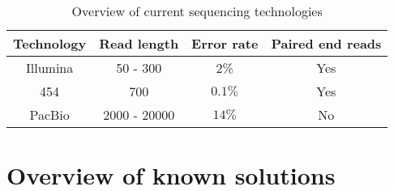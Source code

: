 \begin{table}[h]
\centering
\begin{tabular}{|c|c|c|c|}
\hline
Technology & Read length & Error rate & Paired end reads \\\hline
Illumina & 50 - 300 & 2\% & Yes\\\hline
454 & 700 & $0.1\%$ & Yes \\\hline
PacBio & 2000 - 20000 & $14\%$ & No \\\hline
\end{tabular}
\caption{Overview of current sequencing technologies}
\label{tab:techs}
\end{table}

\section{Overview of known solutions}


